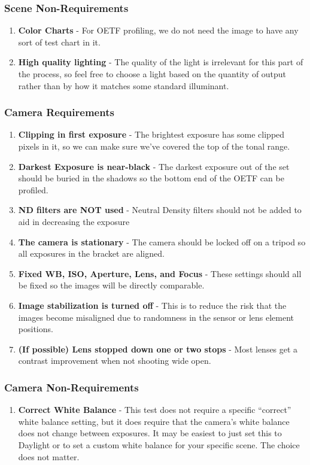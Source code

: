 \documentclass[twoside]{article}
\begin{document}
\subsubsection{Scene Non-Requirements}
\begin{enumerate}
    \item \textbf{Color Charts} - For OETF profiling, we do not need the image to have any sort of test chart in it.
    \item \textbf{High quality lighting} - The quality of the light is irrelevant for this part of the process, so feel free to choose a light based on the quantity of output rather than by how it matches some standard illuminant.
\end{enumerate}

\subsubsection{Camera Requirements}
\begin{enumerate}
    \item \textbf{Clipping in first exposure} - The brightest exposure has some clipped pixels in it, so we can make sure we've covered the top of the tonal range.
    \item \textbf{Darkest Exposure is near-black} - The darkest exposure out of the set should be buried in the shadows so the bottom end of the OETF can be profiled.
    \item \textbf{ND filters are NOT used} - Neutral Density filters should not be added to aid in decreasing the exposure
    \item \textbf{The camera is stationary} - The camera should be locked off on a tripod so all exposures in the bracket are aligned.
    \item \textbf{Fixed WB, ISO, Aperture, Lens, and Focus} - These settings should all be fixed so the images will be directly comparable.
    \item \textbf{Image stabilization is turned off} - This is to reduce the risk that the images become misaligned due to randomness in the sensor or lens element positions.
    \item \textbf{(If possible) Lens stopped down one or two stops} - Most lenses get a contrast improvement when not shooting wide open.
\end{enumerate}

\subsubsection{Camera Non-Requirements}
\begin{enumerate}
    \item \textbf{Correct White Balance} - This test does not require a specific ``correct'' white balance setting, but it does require that the camera's white balance does not change between exposures. It may be easiest to just set this to Daylight or to set a custom white balance for your specific scene. The choice does not matter.
\end{enumerate}
\end{document}
